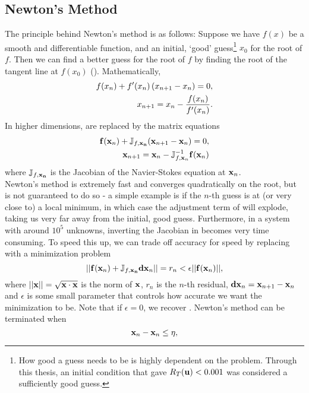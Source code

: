 \subsection{Newton's Method}
The principle behind Newton's method is as follows: Suppose we have $f(x)$ be a smooth and differentiable function, and an initial, `good' guess\footnote{How good a guess needs to be is highly dependent on the problem. Through this thesis, an initial condition that gave $R_T(\mathbf{u}) < 0.001$ was considered a sufficiently good guess.}  $x_0$ for the root of $f$. Then we can find a better guess for the root of $f$ by finding the root of the tangent line at $f(x_0)$ (). Mathematically, 
\begin{align}
f(x_n) + f'(x_n)\left ( x_{n+1} - x_n \right ) = 0,\label{eq:NRS1D}\\ 
x_{n+1} = x_n - \dfrac{f(x_n)}{f'(x_n)}.\label{eq:NR1D}
\end{align}
In higher dimensions,  are replaced by the matrix equations
\begin{align}
\mathbf{f}(\mathbf{x}_n) + \mathbb{J}_{f,\mathbf{x_n}}(\mathbf{x}_{n+1} - \mathbf{x}_n) = 0,\label{eq:NRSND}\\
\mathbf{x}_{n+1} = \mathbf{x}_n - \mathbb{J}_{f,\mathbf{x}_n}^{-1}\mathbf{f}(\mathbf{x}_n)
\end{align}
where $\mathbb{J}_{f,\mathbf{x_n}}$ is the Jacobian of the Navier-Stokes equation at $\mathbf{x}_n$.\\
 
Newton's method is extremely fast and converges quadratically on the root, but is not guaranteed to do so - a simple example is if the $n$-th guess is at (or very close to) a local minimum, in which case the adjustment term of  will explode, taking us very far away from the initial, good guess. Furthermore, in a system with around $10^5$ unknowns, inverting the Jacobian in  becomes very time consuming. To speed this up, we can trade off accuracy for speed by replacing    with a minimization problem
\begin{equation}
||\mathbf{f}(\mathbf{x}_n) + \mathbb{J}_{f,\mathbf{x_n}}\mathbf{dx}_n|| = r_n< \epsilon ||\mathbf{f}(\mathbf{x}_n)||,
\end{equation}
where $||\mathbf{x}|| = \sqrt{\mathbf{x} \cdot \mathbf{x}}$ is the norm of $\mathbf{x}$, $r_n$ is the $n$-th residual, $\mathbf{dx}_n = \mathbf{x}_{n+1} - \mathbf{x}_n$ and $\epsilon$ is some small parameter that controls how accurate we want the minimization to be. Note that if $\epsilon = 0$, we recover . Newton's method can be terminated when 
\begin{equation}
\mathbf{x}_{n} - \mathbf{x}_n \leq \eta, 
\end{equation}

